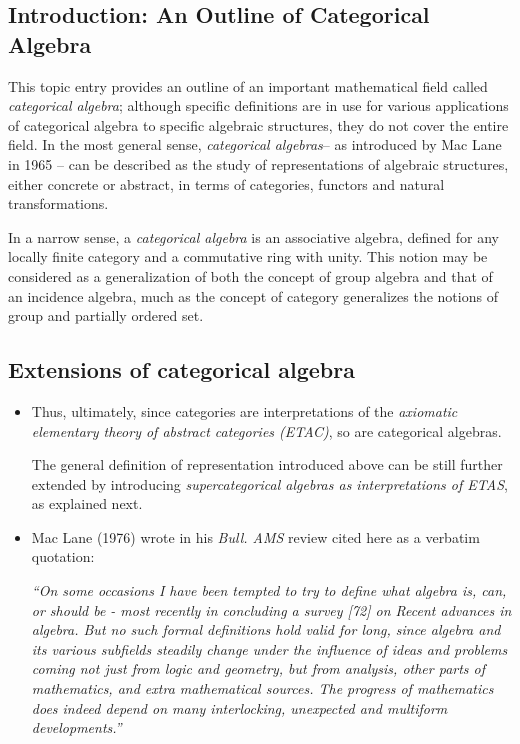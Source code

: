 \documentclass[12pt]{article}
\theoremstyle{plain}
\theoremstyle{definition}
\numberwithin{equation}{section}
\newcommand{\<}{{\langle}}
\begin{document}
\subsection{Introduction: An Outline of Categorical Algebra}
This topic entry provides an outline of an important mathematical field called {\em categorical algebra}; although  specific definitions are in use for various applications of categorical algebra to specific algebraic structures, they do not cover the entire field. In the most general sense, \emph{categorical algebras}-- as introduced by Mac Lane in 1965 -- can be described as the study of representations of algebraic structures, either concrete or abstract, in terms of categories, functors and natural transformations. 

In a narrow sense, a \emph{categorical algebra} is an associative algebra, defined for any locally finite category and a commutative ring with unity. This notion may be considered as a generalization of both the concept of group algebra and that of an incidence algebra, much as the concept of category generalizes the notions of group and partially ordered set.


\subsection{Extensions of categorical algebra} 

\begin{itemize}
\item Thus, ultimately, since categories are interpretations of the \emph{axiomatic elementary theory of abstract categories (ETAC)}, so are categorical algebras. 

 The general definition of representation introduced above can be still further extended by introducing \emph{supercategorical algebras as interpretations of ETAS}, as explained next. 

\item Mac Lane (1976) wrote in his {\em Bull. AMS} review cited here as a verbatim quotation: 


 \emph{``On some occasions I have been tempted to try to define what algebra is,
can, or should be - most recently in concluding a survey [72] on Recent
advances in algebra. But no such formal definitions hold valid for long, since
algebra and its various subfields steadily change under the influence of ideas
and problems coming not just from logic and geometry, but from analysis,
other parts of mathematics, and extra mathematical sources. The progress of
mathematics does indeed depend on many interlocking, unexpected and
multiform developments.''}  
\end{itemize}
\end{document}
